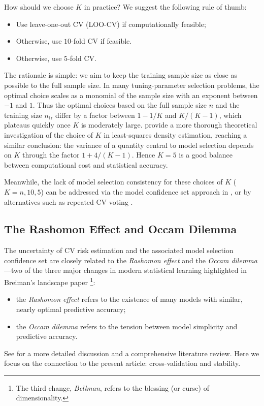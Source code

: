 \documentclass[11pt]{article}
\theoremstyle{plain}
\begin{document}
How should we choose \(K\) in practice? We suggest the following rule of thumb:
\begin{itemize}
\item Use leave-one-out CV (LOO-CV) if computationally feasible;
 \item  Otherwise, use \(10\)-fold CV if feasible.
  \item Otherwise, use \(5\)-fold CV.%
\end{itemize}
The rationale is simple: we aim to keep the training sample size as close as possible to the full sample size. In many tuning-parameter selection problems, the optimal choice scales as a monomial of the sample size with an exponent between \(-1\) and \(1\). Thus the optimal choices based on the full sample size \(n\) and the training size \(n_{\mathrm{tr}}\) differ by a factor between \(1-1/K\) and \(K/(K-1)\), which plateaus quickly once \(K\) is moderately large. \cite{arlot2016choice} provide a more thorough theoretical investigation of the choice of \(K\) in least-squares density estimation, reaching a similar conclusion: the variance of a quantity central to model selection depends on \(K\) through the factor \(1 + 4/(K-1)\). Hence \(K=5\) is a good balance between computational cost and statistical accuracy. 

Meanwhile, the lack of model selection consistency for these choices of \(K\) (\(K=n,10,5\)) can be addressed via the model confidence set approach in , or by alternatives such as repeated-CV voting \citep{zhang2015cross,zhan2022profile}.

\subsection{The Rashomon Effect and Occam Dilemma}\label{subsec:7.3-rashomon}
The uncertainty of CV risk estimation and the associated model selection confidence set are closely related to the \emph{Rashomon effect} and the \emph{Occam dilemma}---two of the three major changes in modern statistical learning highlighted in Breiman’s landscape paper \cite{breiman2001statistical}\footnote{The third change, \emph{Bellman}, refers to the blessing (or curse) of dimensionality.}:
\begin{itemize}
    \item [-] the \emph{Rashomon effect} refers to the existence of many models with similar, nearly optimal predictive accuracy;
    \item [-] the \emph{Occam dilemma} refers to the tension between model simplicity and predictive accuracy.
\end{itemize}
See \cite{rudin2025leo} for a more detailed discussion and a comprehensive literature review. Here we focus on the connection to the present article: cross-validation and stability.
\end{document}
